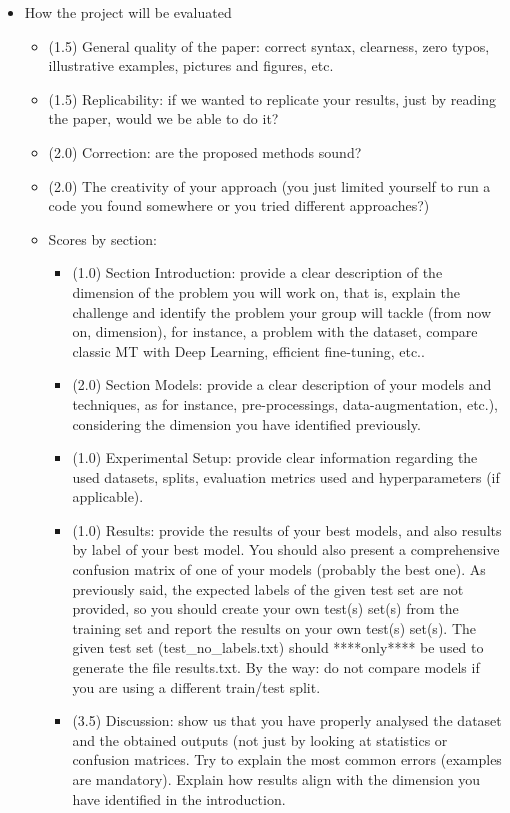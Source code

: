 \documentclass[twocolumn,10pt]{article}
\begin{document}
 \begin{itemize}
 \item{How the project will be evaluated}
\begin{itemize}
\item (1.5) General quality of the paper: correct syntax, clearness, zero typos, illustrative examples, pictures and figures, etc.
\item (1.5) Replicability: if we wanted to replicate your results, just by reading the paper, would we be able to do it?
\item (2.0) Correction: are the proposed methods sound?
\item (2.0) The creativity of your approach (you just limited yourself to run a code you found somewhere or you tried different approaches?)
\item Scores by section:
\begin{itemize}
\item (1.0) Section Introduction: provide a clear description of the dimension of the problem you will work on, that is, explain the challenge and identify the problem your group will tackle (from now on, dimension), for instance, a problem with the dataset, compare classic MT with Deep Learning, efficient fine-tuning, etc..
\item (2.0) Section Models: provide a clear description of your models and techniques, as for instance, pre-processings, data-augmentation, etc.), considering the dimension you have identified previously.
\item (1.0) Experimental Setup: provide clear information regarding the used datasets, splits, evaluation metrics used and hyperparameters (if applicable).
\item (1.0) Results: provide the results of your best models, and also results by label of your best model. You should also present a comprehensive confusion matrix of one of your models (probably the best one). As previously said, the expected labels of the given test set are not provided, so you should create your own test(s) set(s) from the training set and report the results on your own test(s) set(s). The given test set (test\_no\_labels.txt) should ****only**** be used to generate the file results.txt. By the way: do not compare models if you are using a different train/test split.
\item (3.5) Discussion: show us that you have properly analysed the dataset and the obtained outputs (not just by looking at statistics or confusion matrices. Try to explain the most common errors (examples are mandatory). Explain how results align with the dimension you have identified in the introduction.

\end{itemize}
\end{itemize}
\end{itemize}
\end{document}

